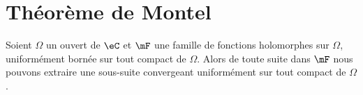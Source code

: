 \section{Théorème de Montel}

\begin{theorem}   \label{ThoXLyCzol}
	Soient \( \Omega\) un ouvert de \( \eC\) et \( \mF\) une famille de fonctions holomorphes sur \( \Omega\), uniformément bornée sur tout compact de \( \Omega\). Alors de toute suite dans \( \mF\) nous pouvons extraire une sous-suite convergeant uniformément sur tout compact de \( \Omega\).
\end{theorem}

